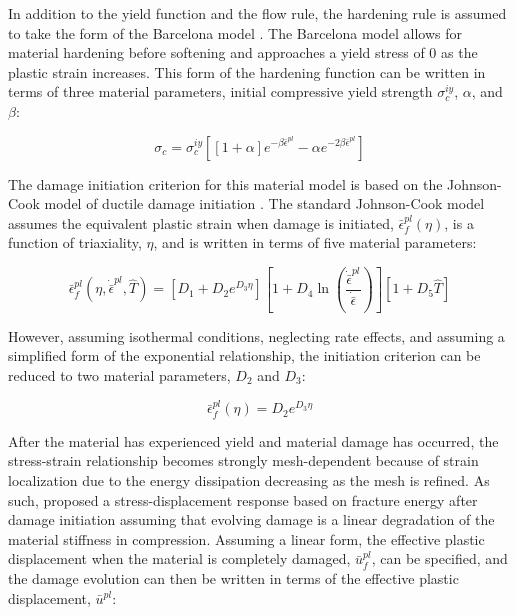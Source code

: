 In addition to the yield function and the flow rule, the hardening rule is assumed to take the form of the Barcelona model \citep{lubliner_plastic-damage_1989}. The Barcelona model allows for material hardening before softening and approaches a yield stress of 0 as the plastic strain increases.  This form of the hardening function can be written in terms of three material parameters, initial compressive yield strength $\sigma_c^{iy}$, $\alpha$, and $\beta$:

\begin{equation}
\sigma_c=\sigma_c^{iy}\left [ \left [1+\alpha \right ] e^{-\beta\bar{\epsilon}^{pl}}-\alpha e^{-2\beta\bar{\epsilon}^{pl}}  \right ]
\label{eqn:druc3}
\end{equation}

The damage initiation criterion for this material model is based on the Johnson-Cook model of ductile damage initiation \citep{Johnson_1985}. The standard Johnson-Cook model assumes the equivalent plastic strain when damage is initiated, $\bar{\epsilon}_{f}^{pl}\left(\eta\right)$, is a function of triaxiality, $\eta$, and is written in terms of five material parameters:

\begin{equation}
\bar{\epsilon}_{f}^{pl}\left(\eta,\dot{\bar{\epsilon}}^{pl},\hat{T}\right)=\left[D_{1}+D_{2}e^{D_{3}\eta}\right]\left[1+D_{4}\ln\left(\frac{\dot{\bar{\epsilon}}^{pl}}{\dot{\bar{\epsilon}}}\right)\right]\left[1+D_{5}\hat{T}\right]\label{eqn:druc7}
\end{equation}

However, assuming isothermal conditions, neglecting rate effects, and assuming a simplified form of the exponential relationship, the initiation criterion can be reduced to two material parameters, $D_2$ and $D_3$:

\begin{equation}
\bar{\epsilon}_{f}^{pl}\left(\eta\right)=D_{2}e^{D_{3}\eta}
\label{eqn:druc4}
\end{equation}

After the material has experienced yield and material damage has occurred, the stress-strain relationship becomes strongly mesh-dependent because of strain localization due to the energy dissipation decreasing as the mesh is refined. As such, \citet{Hillerborg_1976} proposed a stress-displacement response based on fracture energy after damage initiation assuming that evolving damage is a linear degradation of the material stiffness in compression. Assuming a linear form, the effective plastic displacement when the material is completely damaged, $\bar{u}^{pl}_f$, can be specified, and the damage evolution can then be written in terms of the effective plastic displacement, $\bar{u}^{pl}$:

